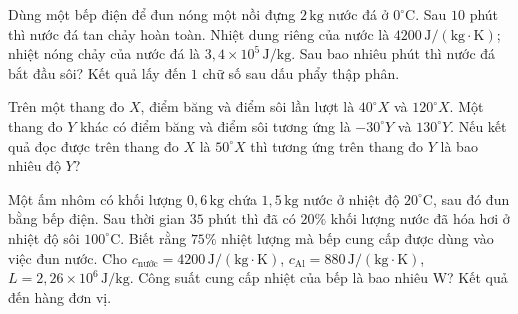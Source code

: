 \begin{ex}
Dùng một bếp điện để đun nóng một nồi đựng $2\,\mathrm{kg}$ nước đá ở $0^\circ\mathrm{C}$. Sau $10$ phút thì nước đá tan chảy hoàn toàn. Nhiệt dung riêng của nước là $4200\,\mathrm{J/(kg\cdot K)}$; nhiệt nóng chảy của nước đá là $3{,}4\times10^5\,\mathrm{J/kg}$. Sau bao nhiêu phút thì nước đá bắt đầu sôi? Kết quả lấy đến $1$ chữ số sau dấu phẩy thập phân.
\end{ex}

\begin{ex}
Trên một thang đo $X$, điểm băng và điểm sôi lần lượt là $40^\circ X$ và $120^\circ X$. Một thang đo $Y$ khác có điểm băng và điểm sôi tương ứng là $-30^\circ Y$ và $130^\circ Y$. Nếu kết quả đọc được trên thang đo $X$ là $50^\circ X$ thì tương ứng trên thang đo $Y$ là bao nhiêu độ $Y$?
\end{ex}

\begin{ex}
Một ấm nhôm có khối lượng $0{,}6\,\mathrm{kg}$ chứa $1{,}5\,\mathrm{kg}$ nước ở nhiệt độ $20^\circ\mathrm{C}$, sau đó đun bằng bếp điện. Sau thời gian $35$ phút thì đã có $20\%$ khối lượng nước đã hóa hơi ở nhiệt độ sôi $100^\circ\mathrm{C}$. Biết rằng $75\%$ nhiệt lượng mà bếp cung cấp được dùng vào việc đun nước. Cho $c_{\mathrm{nước}}=4200\,\mathrm{J/(kg\cdot K)}$, $c_{\mathrm{Al}}=880\,\mathrm{J/(kg\cdot K)}$, $L=2{,}26\times10^6\,\mathrm{J/kg}$. Công suất cung cấp nhiệt của bếp là bao nhiêu W? Kết quả đến hàng đơn vị.
\end{ex}

